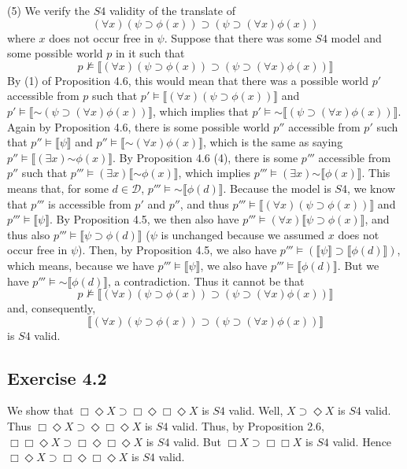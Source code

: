 \documentclass{article}
\newcommand*{\oldneg}{\mathord{\sim}}
\newcommand{\lbc}{\llbracket}
\newcommand{\rbc}{\rrbracket}
\theoremstyle{definition}
\begin{document}
(5) We verify the $S4$ validity of the translate of 
\[ (\forall x)(\psi\supset\phi(x))\supset (\psi\supset(\forall x)\phi(x)) \]
where $x$ does not occur free in $\psi$.
Suppose that there was some $S4$ model and some possible world $p$ in it such that 
\[ p\nvDash\lbc (\forall x)(\psi\supset\phi(x))\supset (\psi\supset(\forall x)\phi(x))\rbc \]
By (1) of Proposition 4.6, this would mean that there was a possible world $p'$ accessible from $p$ such that 
$p'\vDash\lbc (\forall x)(\psi\supset\phi(x))\rbc$ and $p'\vDash\lbc\oldneg(\psi\supset(\forall x)\phi(x))\rbc$,
which implies that $p'\vDash\oldneg\lbc(\psi\supset(\forall x)\phi(x))\rbc$.
Again by Proposition 4.6, there is some possible world $p''$ accessible from $p'$ such that
$p''\vDash\lbc\psi\rbc$ and $p''\vDash\lbc\oldneg(\forall x)\phi(x)\rbc$, which is the same as saying
$p''\vDash\lbc(\exists x)\oldneg\phi(x)\rbc$. By Proposition 4.6 (4), there is some $p'''$ accessible from $p''$ such that
$p'''\vDash(\exists x)\lbc\oldneg\phi(x)\rbc$, which implies $p'''\vDash(\exists x)\oldneg\lbc\phi(x)\rbc$. This means that, for 
some $d\in\mathcal{D}$, $p'''\vDash\oldneg\lbc\phi(d)\rbc$. Because the model is $S4$, we know that 
$p'''$ is accessible from $p'$ and $p''$, and thus $p'''\vDash\lbc (\forall x)(\psi\supset\phi(x))\rbc$ and 
$p'''\vDash\lbc\psi\rbc$. By Proposition 4.5, we then also have
$p'''\vDash(\forall x)\lbc \psi\supset\phi(x)\rbc$, and thus also
$p'''\vDash\lbc\psi\supset\phi(d)\rbc$ ($\psi$ is unchanged because we assumed $x$ does not occur free in $\psi$).
Then, by Proposition 4.5, we also have $p'''\vDash(\lbc\psi\rbc\supset\lbc\phi(d)\rbc)$, which means, because we 
have $p'''\vDash\lbc\psi\rbc$, we also have $p'''\vDash\lbc\phi(d)\rbc$. But we have 
$p'''\vDash\oldneg\lbc\phi(d)\rbc$, a contradiction. Thus it cannot be that
\[ p\nvDash\lbc (\forall x)(\psi\supset\phi(x))\supset (\psi\supset(\forall x)\phi(x))\rbc \]
and, consequently,
\[ \lbc (\forall x)(\psi\supset\phi(x))\supset (\psi\supset(\forall x)\phi(x))\rbc \] is $S4$ valid. 

\subsection*{Exercise 4.2}
We show that $\Box\Diamond X\supset\Box\Diamond\Box\Diamond X$ is $S4$ valid. Well, 
$X\supset\Diamond X$ is $S4$ valid. Thus $\Box\Diamond X\supset\Diamond\Box\Diamond X$ is $S4$ valid.
Thus, by Proposition 2.6, $\Box\Box\Diamond X\supset\Box\Diamond\Box\Diamond X$ is $S4$ valid. 
But $\Box X\supset\Box\Box X$ is $S4$ valid. Hence 
$\Box\Diamond X\supset\Box\Diamond\Box\Diamond X$ is $S4$ valid.
\end{document}

